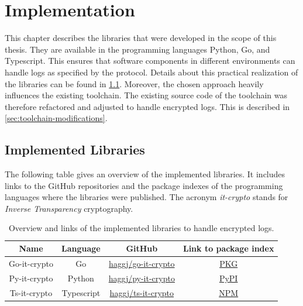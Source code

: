 \documentclass[../main.tex]{subfiles}
\begin{document}
\chapter{Implementation}
\label{chap:implementation}

This chapter describes the libraries that were developed in the scope of this thesis.
They are available in the programming languages Python, Go, and Typescript.
This ensures that software components in different environments can handle logs as specified by the protocol.
Details about this practical realization of the libraries can be found in \cref{sec:implemented-libraries}.
Moreover, the chosen approach heavily influences the existing toolchain.
The existing source code of the toolchain was therefore refactored and adjusted to handle encrypted logs.
This is described in \cref{sec:toolchain-modifications}.

\section{Implemented Libraries}
\label{sec:implemented-libraries}

The following table gives an overview of the implemented libraries.
It includes links to the GitHub repositories and the package indexes of the programming languages where the libraries were published.
The acronym \emph{it-crypto} stands for \emph{Inverse Transparency} cryptography.

\begin{table}[ht]
    \centering
    \begin{tabular}{|c|c|c|c|}
    \hline
    Name         & Language & GitHub                           & Link to package index                                   \\ \hline
    Go-it-crypto & Go                   & \href{https://github.com/haggj/go-it-crypto}{haggj/go-it-crypto} & \href{https://pkg.go.dev/github.com/haggj/go-it-crypto}{PKG} \\ \hline
    Py-it-crypto & Python               & \href{https://github.com/haggj/py-it-crypto}{haggj/py-it-crypto} & \href{https://pypi.org/project/py-it-crypto/}{PyPI}          \\ \hline
    Ts-it-crypto & Typescript           & \href{https://github.com/haggj/ts-it-crypto}{haggj/ts-it-crypto} & \href{https://www.npmjs.com/package/ts-it-crypto}{NPM}       \\ \hline
    \end{tabular}
    \caption[Overview implemented libraries]{Overview and links of the implemented libraries to handle encrypted logs.}
\end{table}
\end{document}
